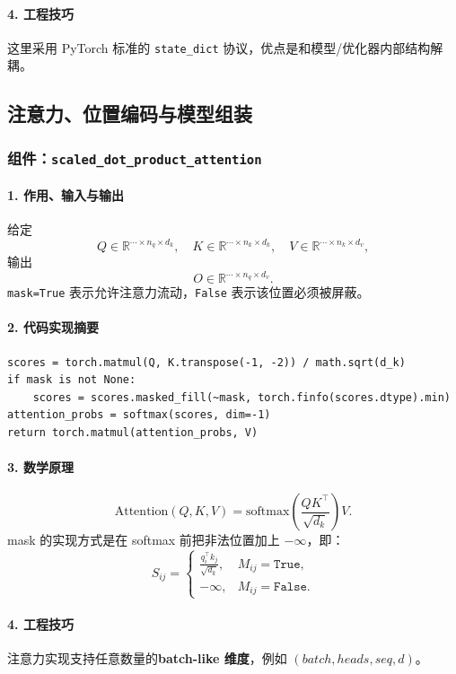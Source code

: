 \documentclass[UTF8,a4paper,11pt]{ctexart}
\begin{document}
\paragraph{4. 工程技巧}
这里采用 PyTorch 标准的 \texttt{state\_dict} 协议，优点是和模型/优化器内部结构解耦。

\subsection{注意力、位置编码与模型组装}

\subsubsection{组件：\texttt{scaled\_dot\_product\_attention}}
\paragraph{1. 作用、输入与输出}
给定
\[
Q \in \mathbb{R}^{\cdots \times n_q \times d_k},\quad
K \in \mathbb{R}^{\cdots \times n_k \times d_k},\quad
V \in \mathbb{R}^{\cdots \times n_k \times d_v},
\]
输出
\[
O \in \mathbb{R}^{\cdots \times n_q \times d_v}.
\]
\texttt{mask=True} 表示允许注意力流动，\texttt{False} 表示该位置必须被屏蔽。

\paragraph{2. 代码实现摘要}
\begin{lstlisting}
scores = torch.matmul(Q, K.transpose(-1, -2)) / math.sqrt(d_k)
if mask is not None:
    scores = scores.masked_fill(~mask, torch.finfo(scores.dtype).min)
attention_probs = softmax(scores, dim=-1)
return torch.matmul(attention_probs, V)
\end{lstlisting}

\paragraph{3. 数学原理}
\[
\mathrm{Attention}(Q,K,V)=\mathrm{softmax}\left(\frac{QK^\top}{\sqrt{d_k}}\right)V.
\]
mask 的实现方式是在 softmax 前把非法位置加上 \(-\infty\)，即：
\[
S_{ij} =
\begin{cases}
\frac{q_i^\top k_j}{\sqrt{d_k}}, & M_{ij}=\texttt{True}, \\
-\infty, & M_{ij}=\texttt{False}.
\end{cases}
\]

\paragraph{4. 工程技巧}
注意力实现支持任意数量的\textbf{batch-like 维度}，例如 \((batch, heads, seq, d)\)。
\end{document}
